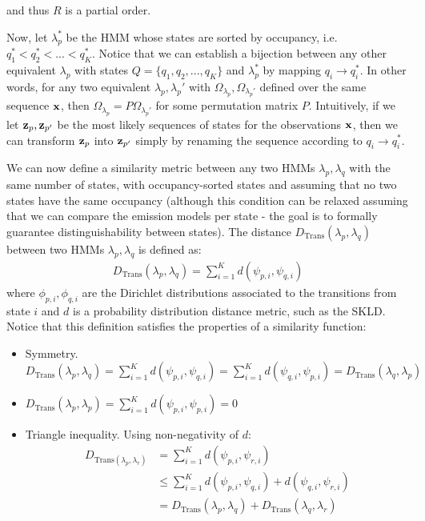 \documentclass[../main.tex]{subfiles}
\begin{document}
and thus $R$ is a partial order.
\par Now, let $\lambda_p^\text{*}$ be the HMM whose states are sorted by occupancy, i.e. $q_1^\text{*} < q_2^\text{*} < ... < q_K^\text{*}$. Notice that we can establish a bijection between any other equivalent $\lambda_p$ with states $Q = \{q_1, q_2, ..., q_K\}$ and $\lambda_p^\text{*}$ by mapping $q_i \rightarrow q_i^\text{*}$. In other words, for any two equivalent $\lambda_p, \lambda_p'$ with $\Omega_{\lambda_p}, \Omega_{\lambda_p'}$ defined over the same sequence $\mathbf{x}$, then $\Omega_{\lambda_p} = P\Omega_{\lambda_p'}$ for some permutation matrix $P$. Intuitively, if we let $\mathbf{z}_p, \mathbf{z}_{p'}$ be the most likely sequences of states for the observations $\mathbf{x}$, then we can transform $\mathbf{z}_p$ into $\mathbf{z}_{p'}$ simply by renaming the sequence according to $q_i \rightarrow q_i^\text{*}$. 
\par We can now define a similarity metric between any two HMMs $\lambda_p, \lambda_q$ with the same number of states, with occupancy-sorted states and assuming that no two states have the same occupancy (although this condition can be relaxed assuming that we can compare the emission models per state - the goal is to formally guarantee distinguishability between states). The distance $D_{\text{Trans}}(\lambda_p, \lambda_q)$ between two HMMs $\lambda_p, \lambda_q$ is defined as:
\begin{align*}
D_{\text{Trans}}(\lambda_p, \lambda_q) = \sum_{i=1}^K d(\psi_{p, i}, \psi_{q, i})
\end{align*}
where $\phi_{p, i}, \phi_{q, i}$ are the Dirichlet distributions associated to the transitions from state $i$ and $d$ is a probability distribution distance metric, such as the SKLD. Notice that this definition satisfies the properties of a similarity function:
\begin{itemize}
\item Symmetry. $D_{\text{Trans}}(\lambda_p, \lambda_q) = \sum_{i=1}^K d(\psi_{p, i}, \psi_{q, i}) = \sum_{i=1}^K d(\psi_{q, i}, \psi_{p, i}) = D_{\text{Trans}}(\lambda_q, \lambda_p)$
\item $D_{\text{Trans}}(\lambda_p, \lambda_p) = \sum_{i=1}^K d(\psi_{p, i}, \psi_{p, i}) = 0$
\item Triangle inequality. Using non-negativity of $d$:
\begin{align*}
D_{\text{Trans}(\lambda_p, \lambda_r)} &= \sum_{i=1}^K d(\psi_{p, i}, \psi_{r, i}) \\
&\leq \sum_{i=1}^K d(\psi_{p, i}, \psi_{q, i}) + d(\psi_{q, i}, \psi_{r, i})\\
&= D_{\text{Trans}}(\lambda_p, \lambda_q) + D_{\text{Trans}}(\lambda_q, \lambda_r)
\end{align*}
\end{itemize}
\end{document}

